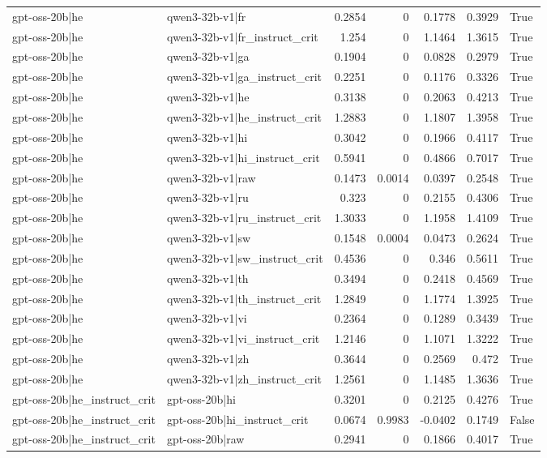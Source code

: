 \begin{table}
\begin{tabular}{l l r r r r l}
gpt-oss-20b|he & qwen3-32b-v1|fr & 0.2854 & 0 & 0.1778 & 0.3929 & True \\
gpt-oss-20b|he & qwen3-32b-v1|fr_instruct_crit & 1.254 & 0 & 1.1464 & 1.3615 & True \\
gpt-oss-20b|he & qwen3-32b-v1|ga & 0.1904 & 0 & 0.0828 & 0.2979 & True \\
gpt-oss-20b|he & qwen3-32b-v1|ga_instruct_crit & 0.2251 & 0 & 0.1176 & 0.3326 & True \\
gpt-oss-20b|he & qwen3-32b-v1|he & 0.3138 & 0 & 0.2063 & 0.4213 & True \\
gpt-oss-20b|he & qwen3-32b-v1|he_instruct_crit & 1.2883 & 0 & 1.1807 & 1.3958 & True \\
gpt-oss-20b|he & qwen3-32b-v1|hi & 0.3042 & 0 & 0.1966 & 0.4117 & True \\
gpt-oss-20b|he & qwen3-32b-v1|hi_instruct_crit & 0.5941 & 0 & 0.4866 & 0.7017 & True \\
gpt-oss-20b|he & qwen3-32b-v1|raw & 0.1473 & 0.0014 & 0.0397 & 0.2548 & True \\
gpt-oss-20b|he & qwen3-32b-v1|ru & 0.323 & 0 & 0.2155 & 0.4306 & True \\
gpt-oss-20b|he & qwen3-32b-v1|ru_instruct_crit & 1.3033 & 0 & 1.1958 & 1.4109 & True \\
gpt-oss-20b|he & qwen3-32b-v1|sw & 0.1548 & 0.0004 & 0.0473 & 0.2624 & True \\
gpt-oss-20b|he & qwen3-32b-v1|sw_instruct_crit & 0.4536 & 0 & 0.346 & 0.5611 & True \\
gpt-oss-20b|he & qwen3-32b-v1|th & 0.3494 & 0 & 0.2418 & 0.4569 & True \\
gpt-oss-20b|he & qwen3-32b-v1|th_instruct_crit & 1.2849 & 0 & 1.1774 & 1.3925 & True \\
gpt-oss-20b|he & qwen3-32b-v1|vi & 0.2364 & 0 & 0.1289 & 0.3439 & True \\
gpt-oss-20b|he & qwen3-32b-v1|vi_instruct_crit & 1.2146 & 0 & 1.1071 & 1.3222 & True \\
gpt-oss-20b|he & qwen3-32b-v1|zh & 0.3644 & 0 & 0.2569 & 0.472 & True \\
gpt-oss-20b|he & qwen3-32b-v1|zh_instruct_crit & 1.2561 & 0 & 1.1485 & 1.3636 & True \\
gpt-oss-20b|he_instruct_crit & gpt-oss-20b|hi & 0.3201 & 0 & 0.2125 & 0.4276 & True \\
gpt-oss-20b|he_instruct_crit & gpt-oss-20b|hi_instruct_crit & 0.0674 & 0.9983 & -0.0402 & 0.1749 & False \\
gpt-oss-20b|he_instruct_crit & gpt-oss-20b|raw & 0.2941 & 0 & 0.1866 & 0.4017 & True \\

\end{tabular}
\end{table}
